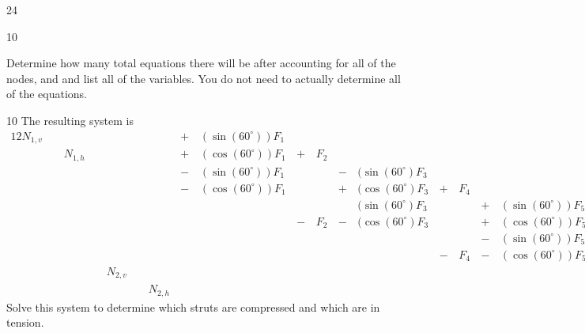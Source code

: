 \begin{applicationActivities}{2}{4}
\begin{activity}{10}
\begin{subactivity}
Determine how many total equations there will be after accounting for all of the nodes, and and list all of the variables.  You do not need to actually determine all of the equations.
\end{subactivity}
\end{activity}


\begin{activity}{10}
\drawtruss[0.8]
The resulting system is 
\begin{alignat*}{12}
N_{1,v} &\,\,& &\,\,& &\,\,& &\,+\,& (\sin(60^\circ))F_1 &\,\,& &\,\,& &\,\,& &\,\,& &\,\,& &\,\,& &\,=\,& 0 \\
        &\,\,& N_{1,h} &\,\,& &\,\,& &\,+\,& (\cos(60^\circ))F_1 &\,+\,&F_2 &\,\,& &\,\,& &\,\,& &\,\,& &\,\,& &\,=\,& 0 \\
        &\,\,&         &\,\,& &\,\,& &\,-\,& (\sin(60^\circ))F_1 &\,\,& &\,-\,&(\sin(60^\circ)F_3 &\,\,& &\,\,& &\,\,& &\,\,& &\,=\,& 0 \\
        &\,\,&         &\,\,& &\,\,& &\,-\,& (\cos(60^\circ))F_1 &\,\,& &\,+\,&(\cos(60^\circ)F_3 &\,+\,&F_4 &\,\,& &\,\,& &\,\,& &\,=\,& 0 \\
        &\,\,&         &\,\,& &\,\,& &\,\,&                     &\,\,& &\,\,&(\sin(60^\circ)F_3 &\,\,& &\,+\,& (\sin(60^\circ))F_5&\,\,& &\,\,& &\,=\,& 10000 \\
        &\,\,&         &\,\,& &\,\,& &\,\,&                     &\,-\,& F_2&\,-\,&(\cos(60^\circ)F_3 &\,\,& &\,+\,& (\cos(60^\circ))F_5&\,+\,&F_6 &\,\,& &\,=\,& 0 \\
        &\,\,&         &\,\,& &\,\,& &\,\,&                     &\,\,& &\,\,&                   &\,\,& &\,-\,& (\sin(60^\circ))F_5&\,\,& &\,-\,& (\sin(60^\circ))F_7&\,=\,& 0 \\
        &\,\,&         &\,\,& &\,\,& &\,\,&                     &\,\,& &\,\,&                   &\,-\,&F_4 &\,-\,& (\cos(60^\circ))F_5&\,\,& &\,+\,& (\cos(60^\circ))F_7&\,=\,& 0 \\
        &\,\,&         &\,\,& N_{2,v} &\,\,& &\,\,&                     &\,\,& &\,\,&                   &\,\,& &\,\,&                    &\,\,& &\,+\,& (\sin(60^\circ))F_7&\,=\,& 0 \\
        &\,\,&         &\,\,& &\,\,&N_{2,h} &\,\,&                     &\,\,& &\,\,&                   &\,\,&    &\,\,&                    &\,-\,& F_6 &\,-\,& (\cos(60^\circ))F_7&\,=\,& 0 
\end{alignat*}
Solve this system to determine which struts are compressed and which are in tension.
\end{activity}


\end{applicationActivities}
